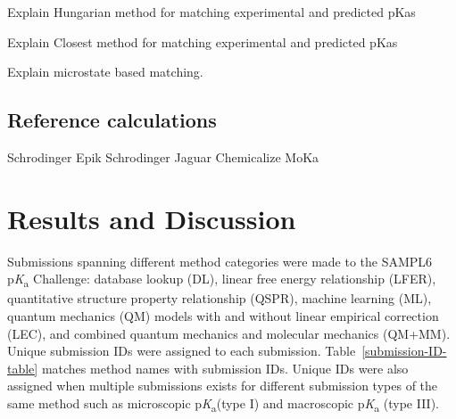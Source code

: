 \documentclass[9pt,lineno,final]{elife}
\newcommand{\pKa}{p\textit{K}\textsubscript{a}}
\begin{document}
Explain Hungarian method for matching experimental and predicted pKas

Explain Closest method for matching experimental and predicted pKas

Explain microstate based matching.


\subsection{Reference calculations}

Schrodinger Epik
Schrodinger Jaguar
Chemicalize
MoKa


\section{Results and Discussion}

 Submissions spanning different method categories were made to the SAMPL6 \pKa{} Challenge: database lookup (DL), linear free energy relationship (LFER), quantitative structure property relationship (QSPR), machine learning (ML), quantum mechanics (QM) models with and without linear empirical correction (LEC), and combined quantum mechanics and molecular mechanics (QM+MM). Unique submission IDs were assigned to each submission. Table~\ref{submission-ID-table} matches method names with submission IDs. Unique IDs were also assigned when multiple submissions exists for different submission types of the same method such as microscopic \pKa{}(type I) and macroscopic \pKa{} (type III). 
\end{document}
